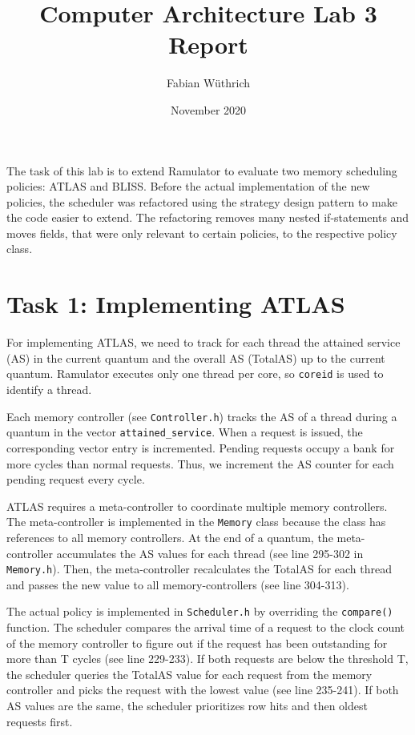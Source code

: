 \documentclass[a4paper]{article}
\begin{document}
\title{Computer Architecture Lab 3 Report}
\author{Fabian Wüthrich}
\date{November 2020}
\maketitle

\noindent
The task of this lab is to extend Ramulator to evaluate two memory scheduling
policies: ATLAS and BLISS. Before the actual implementation of the new
policies, the scheduler was refactored using the strategy design pattern to
make the code easier to extend. The refactoring removes many nested
if-statements and moves fields, that were only relevant to certain policies, to
the respective policy class.

\section*{Task 1: Implementing ATLAS}

For implementing ATLAS, we need to track for each thread the attained service
(AS) in the current quantum and the overall AS (TotalAS) up to the current quantum.
Ramulator executes only one thread per core, so \verb|coreid| is used
to identify a thread.

Each memory controller (see \verb|Controller.h|) tracks the AS of
a thread during a quantum in the vector \verb|attained_service|. When a request
is issued, the corresponding vector entry is incremented. Pending requests
occupy a bank for more cycles than normal requests. Thus, we increment the AS
counter for each pending request every cycle.

ATLAS requires a meta-controller to coordinate multiple memory controllers. The
meta-controller is implemented in the \verb|Memory| class because the class
has references to all memory controllers. At the end of a quantum, the
meta-controller accumulates the AS values for each thread (see line 295-302 in
\verb|Memory.h|). Then, the meta-controller recalculates the TotalAS for each
thread and passes the new value to all memory-controllers (see line 304-313).

The actual policy is implemented in \verb|Scheduler.h| by overriding the
\verb|compare()| function. The scheduler compares the arrival time of a request
to the clock count of the memory controller to figure out if the request has
been outstanding for more than T cycles (see line 229-233). If both requests are
below the threshold T, the scheduler queries the TotalAS value for each request
from the memory controller and picks the request with the lowest value (see line
235-241). If both AS values are the same, the scheduler prioritizes row hits and
then oldest requests first.
\end{document}
